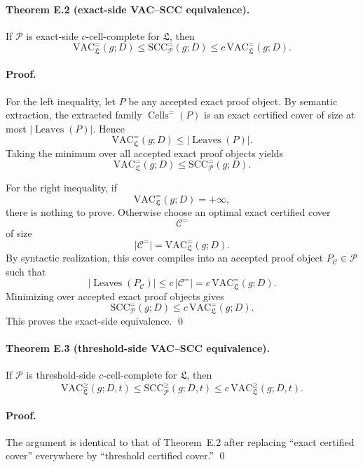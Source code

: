 \paragraph{Theorem E.2 (exact-side VAC--SCC equivalence).}
If $\mathcal P$ is exact-side $c$-cell-complete for $\mathfrak L$, then
\[
\mathrm{VAC}^{=}_{\mathfrak L}(g;D)
\le
\mathrm{SCC}^{=}_{\mathcal P}(g;D)
\le
c\,\mathrm{VAC}^{=}_{\mathfrak L}(g;D).
\]

\paragraph{Proof.}
For the left inequality, let $P$ be any accepted exact proof object. By semantic extraction, the extracted family $\operatorname{Cells}^{=}(P)$ is an exact certified cover of size at most $|\operatorname{Leaves}(P)|$. Hence
\[
\mathrm{VAC}^{=}_{\mathfrak L}(g;D)
\le
|\operatorname{Leaves}(P)|.
\]
Taking the minimum over all accepted exact proof objects yields
\[
\mathrm{VAC}^{=}_{\mathfrak L}(g;D)
\le
\mathrm{SCC}^{=}_{\mathcal P}(g;D).
\]

For the right inequality, if
\[
\mathrm{VAC}^{=}_{\mathfrak L}(g;D)=+\infty,
\]
there is nothing to prove. Otherwise choose an optimal exact certified cover
\[
\mathcal C^{=}
\]
of size
\[
|\mathcal C^{=}|=\mathrm{VAC}^{=}_{\mathfrak L}(g;D).
\]
By syntactic realization, this cover compiles into an accepted proof object $P_{\mathcal C}\in\mathcal P$ such that
\[
|\operatorname{Leaves}(P_{\mathcal C})|
\le
c\,|\mathcal C^{=}|
=
c\,\mathrm{VAC}^{=}_{\mathfrak L}(g;D).
\]
Minimizing over accepted exact proof objects gives
\[
\mathrm{SCC}^{=}_{\mathcal P}(g;D)
\le
c\,\mathrm{VAC}^{=}_{\mathfrak L}(g;D).
\]
This proves the exact-side equivalence. \qed

\paragraph{Theorem E.3 (threshold-side VAC--SCC equivalence).}
If $\mathcal P$ is threshold-side $c$-cell-complete for $\mathfrak L$, then
\[
\mathrm{VAC}^{\ge}_{\mathfrak L}(g;D,t)
\le
\mathrm{SCC}^{\ge}_{\mathcal P}(g;D,t)
\le
c\,\mathrm{VAC}^{\ge}_{\mathfrak L}(g;D,t).
\]

\paragraph{Proof.}
The argument is identical to that of Theorem~E.2 after replacing ``exact certified cover'' everywhere by ``threshold certified cover.'' \qed

